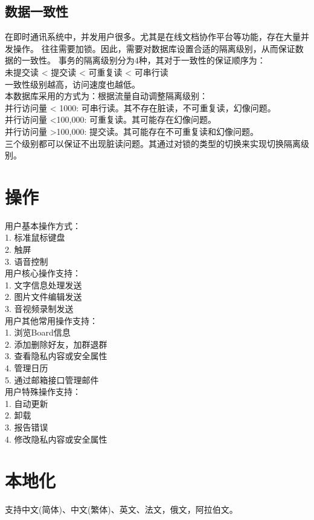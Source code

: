 {\subsection{\color{red} 数据一致性}
在即时通讯系统中，并发用户很多。尤其是在线文档协作平台等功能，存在大量并发操作。
往往需要加锁。因此，需要对数据库设置合适的隔离级别，从而保证数据的一致性。
事务的隔离级别分为4种，其对于一致性的保证顺序为：\\
未提交读 < 提交读 < 可重复读 < 可串行读\\
一致性级别越高，访问速度也越低。\\

本数据库采用的方式为：根据流量自动调整隔离级别：\\
并行访问量 < 1000: 可串行读。其不存在脏读，不可重复读，幻像问题。\\
并行访问量 <100,000: 可重复读。其可能存在幻像问题。\\
并行访问量 >100,000: 提交读。其可能存在不可重复读和幻像问题。\\

三个级别都可以保证不出现脏读问题。其通过对锁的类型的切换来实现切换隔离级别。
}
\section{操作}
\noindent
用户基本操作方式：\\
    1. 标准鼠标键盘\\
    2. 触屏\\
    3. 语音控制\\
用户核心操作支持：\\
    1. 文字信息处理发送\\
    2. 图片文件编辑发送\\
    3. 音视频录制发送\\
用户其他常用操作支持：  \\
    1. 浏览Board信息\\
    2. 添加删除好友，加群退群\\
    3. 查看隐私内容或安全属性\\
    4. 管理日历\\
    5. 通过邮箱接口管理邮件\\
用户特殊操作支持：\\
    1. 自动更新\\
    2. 卸载\\
    3. 报告错误\\
    4. 修改隐私内容或安全属性
\section{本地化}
支持中文(简体)、中文(繁体)、英文、法文，俄文，阿拉伯文。